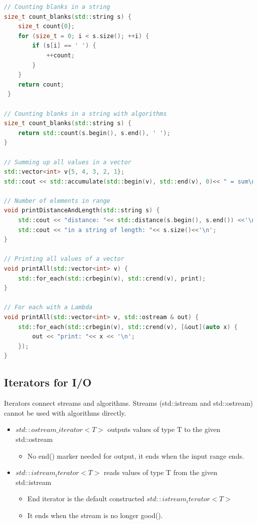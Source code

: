 \begin{lstlisting}[language=C++]
// Counting blanks in a string
size_t count_blanks(std::string s) {
 	size_t count{0};
 	for (size_t = 0; i < s.size(); ++i) {
 		if (s[i] == ' ') {
 			++count;
 		}
 	}
 	return count;
 }
 
// Counting blanks in a string with algorithms
size_t count_blanks(std::string s) {
	return std::count(s.begin(), s.end(), ' ');
}

// Summing up all values in a vector
std::vector<int> v{5, 4, 3, 2, 1}; 
std::cout << std::accumulate(std::begin(v), std::end(v), 0)<< " = sum\n";

// Number of elements in range 
void printDistanceAndLength(std::string s) {
	std::cout << "distance: "<< std::distance(s.begin(), s.end()) <<'\n';
	std::cout << "in a string of length: "<< s.size()<<'\n'; 
} 	

// Printing all values of a vector
void printAll(std::vector<int> v) {
	std::for_each(std::crbegin(v), std::crend(v), print); 
}

// For each with a Lambda
void printAll(std::vector<int> v, std::ostream & out) {
	std::for_each(std::crbegin(v), std::crend(v), [&out](auto x) {
		out << "print: "<< x << '\n';
	});
}

\end{lstlisting}


\subsection{Iterators for I/O}
Iterators connect streams and algorithms.  Streams (std::istream and std::ostream) cannot be used with algorithms directly.
\begin{itemize}
	\itemsep -0.5em 
  	\item $std::ostream\_iterator<T>$ outputs values of type T to the given std::ostream
  	\begin{itemize}
  		\item No end() marker needed for output, it ends when the input range ends.
  	\end{itemize}
  	
  	\item  $std::istream_iterator<T>$ reads values of type T from the given std::istream
	\begin{itemize}
  		\item End iterator is the default constructed $std::istream_iterator<T>{}$
   		\item It ends when the stream is no longer good().
   	\end{itemize}
\end{itemize}

\break